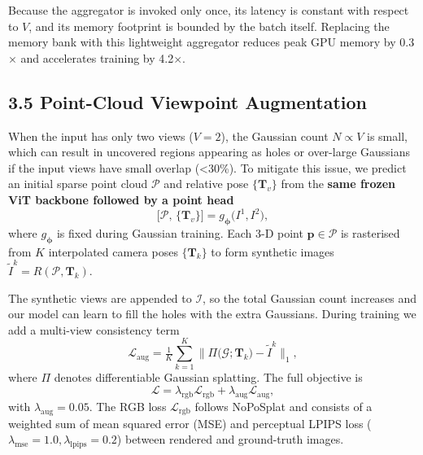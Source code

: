 \documentclass[letterpaper]{article} %
\begin{document}
Because the aggregator is invoked only once, its latency is constant with respect to \(V\), and its memory footprint is bounded by the batch itself.
Replacing the memory bank with this lightweight aggregator reduces peak GPU memory by 0.3$\times$ and accelerates training by 4.2$\times$.

\subsection{3.5 Point-Cloud Viewpoint Augmentation}
\label{sec:pca}
When the input has only two views ($V{=}2$), the Gaussian count $N\!\propto\!V$ is small, which can result in uncovered regions appearing as holes or over-large Gaussians if the input views have small overlap (<30\%).
To mitigate this issue, we predict an initial sparse point cloud $\mathcal{P}$ and relative pose $\{\mathbf{T}_{v}\}$ from the \textbf{same frozen ViT backbone followed by a point head}
\begin{equation}
    \bigl[\mathcal{P},\,\{\mathbf{T}_{v}\}\bigr]
      = g_{\boldsymbol\phi}\bigl( I^{1}, I^{2}\bigr),
\end{equation}
where $g_{\boldsymbol\phi}$ is fixed during Gaussian training.
Each 3-D point $\mathbf{p}\!\in\!\mathcal{P}$ is rasterised from $K$ interpolated camera poses $\{\mathbf{T}_{k}\}$ to form synthetic images
$
    \widetilde{I}^{k} = R(\mathcal{P},\mathbf{T}_{k}).
$

The synthetic views are appended to $\mathcal{I}$, so the total Gaussian count increases and our model can learn to fill the holes with the extra Gaussians.  
During training we add a multi-view consistency term
\begin{equation}
    \mathcal{L}_{\text{aug}} 
      = \tfrac{1}{K}\sum_{k=1}^{K}
        \bigl\|
          \Pi\bigl(\mathcal{G};\mathbf{T}_{k}\bigr) - \widetilde{I}^{k}
        \bigr\|_{1},
\end{equation}
where $\Pi$ denotes differentiable Gaussian splatting.  
The full objective is
\begin{equation}
    \mathcal{L}
      = \lambda_{\text{rgb}}\mathcal{L}_{\text{rgb}}
      + \lambda_{\text{aug}}\mathcal{L}_{\text{aug}},
\end{equation}
with $\lambda_{\text{aug}}\!=\!0.05$. The RGB loss $\mathcal{L}_{\text{rgb}}$ follows NoPoSplat and consists of a weighted sum of mean squared error (MSE) and perceptual LPIPS loss ($\lambda_{\text{mse}}=1.0, \lambda_{\text{lpips}}=0.2$) between rendered and ground-truth images.
\end{document}
